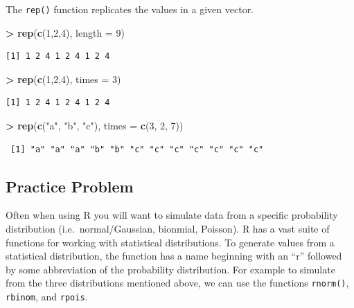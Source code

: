 \documentclass[]{krantz}
\makeatletter
\newenvironment{Shaded}{\begin{snugshade}}{\end{snugshade}}
\newcommand{\KeywordTok}[1]{\textcolor[rgb]{0.27,0.27,0.27}{\textbf{#1}}}
\newcommand{\DataTypeTok}[1]{\textcolor[rgb]{0.27,0.27,0.27}{#1}}
\newcommand{\DecValTok}[1]{\textcolor[rgb]{0.06,0.06,0.06}{#1}}
\newcommand{\StringTok}[1]{\textcolor[rgb]{0.5,0.5,0.5}{#1}}
\newcommand{\OperatorTok}[1]{\textcolor[rgb]{0.43,0.43,0.43}{\textbf{#1}}}
\newcommand{\NormalTok}[1]{#1}
\newenvironment{kframe}{%
\medskip{}
\setlength{\fboxsep}{.8em}
 \def\at@end@of@kframe{}%
 \ifinner\ifhmode%
  \def\at@end@of@kframe{\end{minipage}}%
  \begin{minipage}{\columnwidth}%
 \fi\fi%
 \def\FrameCommand##1{\hskip\@totalleftmargin \hskip-\fboxsep
 \colorbox{shadecolor}{##1}\hskip-\fboxsep
     \hskip-\linewidth \hskip-\@totalleftmargin \hskip\columnwidth}%
 \MakeFramed {\advance\hsize-\width
   \@totalleftmargin\z@ \linewidth\hsize
   \@setminipage}}%
 {\par\unskip\endMakeFramed%
 \at@end@of@kframe}
\renewenvironment{Shaded}{\begin{kframe}}{\end{kframe}}
\makeatother
\begin{document}
The \texttt{rep()} function replicates the values in a given vector.

\begin{Shaded}
\begin{Highlighting}[]
\OperatorTok{>}\StringTok{ }\KeywordTok{rep}\NormalTok{(}\KeywordTok{c}\NormalTok{(}\DecValTok{1}\NormalTok{,}\DecValTok{2}\NormalTok{,}\DecValTok{4}\NormalTok{), }\DataTypeTok{length =} \DecValTok{9}\NormalTok{)}
\end{Highlighting}
\end{Shaded}

\begin{verbatim}
[1] 1 2 4 1 2 4 1 2 4
\end{verbatim}

\begin{Shaded}
\begin{Highlighting}[]
\OperatorTok{>}\StringTok{ }\KeywordTok{rep}\NormalTok{(}\KeywordTok{c}\NormalTok{(}\DecValTok{1}\NormalTok{,}\DecValTok{2}\NormalTok{,}\DecValTok{4}\NormalTok{), }\DataTypeTok{times =} \DecValTok{3}\NormalTok{)}
\end{Highlighting}
\end{Shaded}

\begin{verbatim}
[1] 1 2 4 1 2 4 1 2 4
\end{verbatim}

\begin{Shaded}
\begin{Highlighting}[]
\OperatorTok{>}\StringTok{ }\KeywordTok{rep}\NormalTok{(}\KeywordTok{c}\NormalTok{(}\StringTok{"a"}\NormalTok{, }\StringTok{"b"}\NormalTok{, }\StringTok{"c"}\NormalTok{), }\DataTypeTok{times =} \KeywordTok{c}\NormalTok{(}\DecValTok{3}\NormalTok{, }\DecValTok{2}\NormalTok{, }\DecValTok{7}\NormalTok{))}
\end{Highlighting}
\end{Shaded}

\begin{verbatim}
 [1] "a" "a" "a" "b" "b" "c" "c" "c" "c" "c" "c" "c"
\end{verbatim}

\subsection{Practice Problem}\label{practice-problem-3}

Often when using R you will want to simulate data from a specific
probability distribution (i.e.~normal/Gaussian, bionmial, Poisson). R
has a vast suite of functions for working with statistical
distributions. To generate values from a statistical distribution, the
function has a name beginning with an ``r'' followed by some
abbreviation of the probability distribution. For example to simulate
from the three distributions mentioned above, we can use the functions
\texttt{rnorm()}, \texttt{rbinom}, and \texttt{rpois}.
\end{document}

